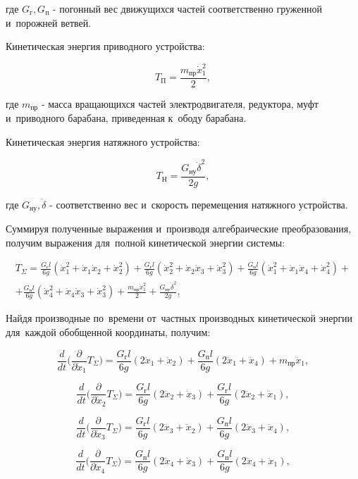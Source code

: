 где $ G_\text{г}, G_\text{п} $ - погонный вес движущихся частей соответственно груженной и~порожней ветвей.

Кинетическая энергия приводного устройства:

$$ T_\text{П} = \frac{m_\text{пр} \dot x_1^2}{2}, $$

где $ m_\text{пр} $ - масса вращающихся частей электродвигателя, редуктора, муфт и~приводного барабана, приведенная к~ободу барабана.

Кинетическая энергия натяжного устройства:

$$ T_\text{Н} = \frac{G_\text{ну} \dot \delta^2}{2g}, $$

где $ G_\text{ну}, \dot \delta $ - соответственно вес и~скорость перемещения натяжного устройства.

Суммируя полученные выражения и~производя алгебраические преобразования, получим выражения для~полной кинетической энергии системы:

 \begin{eqnarray} T_\Sigma = \frac{G_\text{г}l}{6g}(\dot x_1^2 + \dot x_1 \dot x_2 + \dot x_2^2  ) + \frac{G_\text{г}l}{6g}(\dot x_2^2 + \dot x_2 \dot x_3 + \dot x_3^2) + \frac{G_\text{п}l}{6g}(\dot x_1^2 + \dot x_1 \dot x_4 + \dot x_4^2  ) + \nonumber \\ + \frac{G_\text{п}l}{6g}(\dot x_4^2 + \dot x_4 \dot x_3 + \dot x_3^2  ) + \frac{m_\text{пр} \dot x_1^2}{2} + \frac{G_\text{ну} \dot \delta^2}{2g}, \nonumber \end{eqnarray} 

Найдя производные по~времени от~частных производных кинетической энергии для~каждой обобщенной координаты, получим:

$$ \frac{d}{dt} \Big(\frac{\partial}{\partial \dot x_1}T_\Sigma \Big) = \frac{G_\text{г}l}{6g}(2 \ddot x_1 + \ddot x_2 ) +  \frac{G_\text{п}l}{6g}(2 \ddot x_1 + \ddot x_4 ) + m_\text{пр} \ddot x_1, $$


$$ \frac{d}{dt} \Big(\frac{\partial}{\partial \dot x_2}T_\Sigma \Big) = \frac{G_\text{г}l}{6g}(2 \ddot x_2 + \ddot x_3 ) +  \frac{G_\text{г}l}{6g}(2 \ddot x_2 + \ddot x_1 ), $$

$$ \frac{d}{dt} \Big(\frac{\partial}{\partial \dot x_3}T_\Sigma \Big) = \frac{G_\text{г}l}{6g}(2 \ddot x_3 + \ddot x_2 ) +  \frac{G_\text{п}l}{6g}(2 \ddot x_3 + \ddot x_4 ), $$

$$ \frac{d}{dt} \Big(\frac{\partial}{\partial \dot x_4}T_\Sigma \Big) = \frac{G_\text{п}l}{6g}(2 \ddot x_4 + \ddot x_3 ) +  \frac{G_\text{п}l}{6g}(2 \ddot x_4 + \ddot x_1 ), $$

